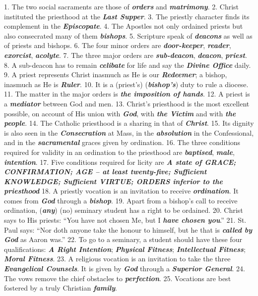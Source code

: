 \documentclass[a4paper,14pt]{memoir}
\newcommand\answer[1]{\textbf{\textit{#1}}}
\begin{document}
1. The two social sacraments are those of \answer{orders} and  \answer{matrimony}.  
2.  Christ
instituted the priesthood at the \answer{Last Supper}. 
3. The priestly  character  finds
its complement in the \answer{Episcopate}. 
4. The Apostles not  only  ordained  priests
but also consecrated many of them \answer{bishops}. 
5. Scripture speak of \answer{deacons}
as well as of priests and bishops. 
6. The four minor  orders  are  \answer{door-keeper},
\answer{reader}, \answer{exorcist}, \answer{acolyte}.  
7.  The  three  major  orders  are  \answer{sub-deacon},
\answer{deacon}, \answer{priest}. 
8. A sub-deacon has to remain \answer{celibate} for  life  and
say the \answer{Divine Office} daily. 
9. A priest represents Christ inasmuch as He is  our
\answer{Redeemer}; a bishop, inasmuch as He is  \answer{Ruler}.  
10.  It  is  a  (priest's)
(\answer{bishop's}) duty to rule a diocese. 
11. The matter in  the  major  orders  is
\answer{the imposition of hands}. 
12. A priest is a \answer{mediator}  between  God  and  men.  
13.  Christ's
priesthood is the most excellent possible, on  account  of  His  union  with
\answer{God}, with \answer{the Victim} and with \answer{the people}. 
14. The Catholic priesthood is  a
sharing in that of \answer{Christ}. 
15. Its dignity is also seen  in  the  \answer{Consecration}
at Mass, in the \answer{absolution} in the Confessional, and  in  the  \answer{sacramental}  graces
given by ordination. 
16. The three conditions required for  validity  in  an
ordination to the priesthood are  \answer{baptised},  \answer{male},  \answer{intention}.  
17.  Five
conditions required for licity are \answer{A state of GRACE; CONFIRMATION; AGE – at least twenty-five; Sufficient KNOWLEDGE; Sufficient VIRTUE; ORDERS inferior to the priesthood}
18. A priestly vocation is an invitation to receive  \answer{ordination}.  It
comes from \answer{God} through a \answer{bishop}. 
19. Apart from a  bishop's  call  to
receive ordination, (\answer{any}) (no) seminary student has a right to be  ordained.
20. Christ says to His priests: ``You have not chosen Me,  but  I  \answer{have chosen you}.''
21. St. Paul says: ``Nor doth anyone take the honour to himself, but he  that
is \answer{called by God} as Aaron was.''
22. To go to a seminary, a  student  should  have
these four  qualifications:  \answer{A Right Intention};  \answer{Physical Fitness};  \answer{Intellectual Fitness};  \answer{Moral Fitness}.  
23.  A
religious vocation is an invitation to take the three \answer{Evangelical Counsels}. It is  given
by \answer{God} through a \answer{Superior General}. 
24. The vows remove the chief  obstacles  to
\answer{perfection}. 
25. Vocations are best fostered by a truly Christian \answer{family}.
\end{document}
